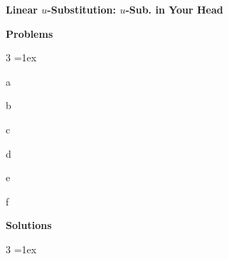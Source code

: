 \documentclass[11pt,letterpaper]{article}
\newenvironment{3enumerate}{%
	\begin{enumerate}[(1)]
	\begin{multicols}{3}
	}{%
	\end{multicols}
	\end{enumerate}
}
\begin{document}

\begin{center} {\bfseries \LARGE Linear $u$-Substitution: $u$-Sub. in Your Head} \end{center} \par\vspace{0.2\baselineskip}

	\begin{center} {\bfseries\Large Problems} \end{center}
\begin{3enumerate} \itemsep=1ex
\item a
\item b 
\item c
\item d
\item e
\item f
\end{3enumerate}

\newpage

	\begin{center} {\bfseries\Large Solutions} \end{center}
\begin{3enumerate} \itemsep=1ex
\item 
\item 
\end{3enumerate}
\end{document}
